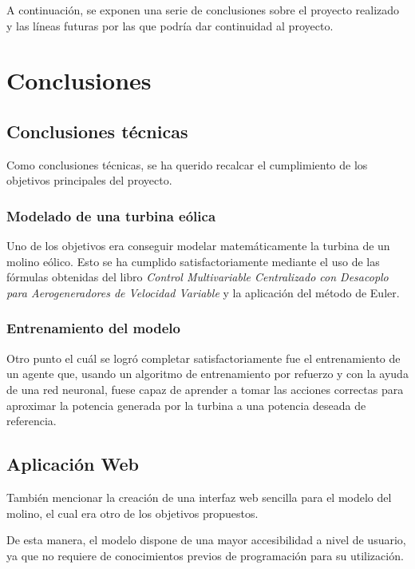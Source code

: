 
A continuación, se exponen una serie de conclusiones sobre el proyecto realizado y las líneas futuras por las que podría dar continuidad al proyecto.


\section{Conclusiones}

\subsection{Conclusiones técnicas}

Como conclusiones técnicas, se ha querido recalcar el cumplimiento de los objetivos principales del proyecto.

\subsubsection{Modelado de una turbina eólica}

Uno de los objetivos era conseguir modelar matemáticamente la turbina de un molino eólico. Esto se ha cumplido satisfactoriamente mediante el uso de las fórmulas obtenidas del libro \textit{Control Multivariable Centralizado con Desacoplo para Aerogeneradores de Velocidad Variable}\cite{control_multivariable} y la aplicación del método de Euler.

\subsubsection{Entrenamiento del modelo}

Otro punto el cuál se logró completar satisfactoriamente fue el entrenamiento de un agente que, usando un algoritmo de entrenamiento por refuerzo y con la ayuda de una red neuronal, fuese capaz de aprender a tomar las acciones correctas para aproximar la potencia generada por la turbina a una potencia deseada de referencia.

\subsection{Aplicación Web}

También mencionar la creación de una interfaz web sencilla para el modelo del molino, el cual era otro de los objetivos propuestos.

De esta manera, el modelo dispone de una mayor accesibilidad a nivel de usuario, ya que no requiere de conocimientos previos de programación para su utilización.


